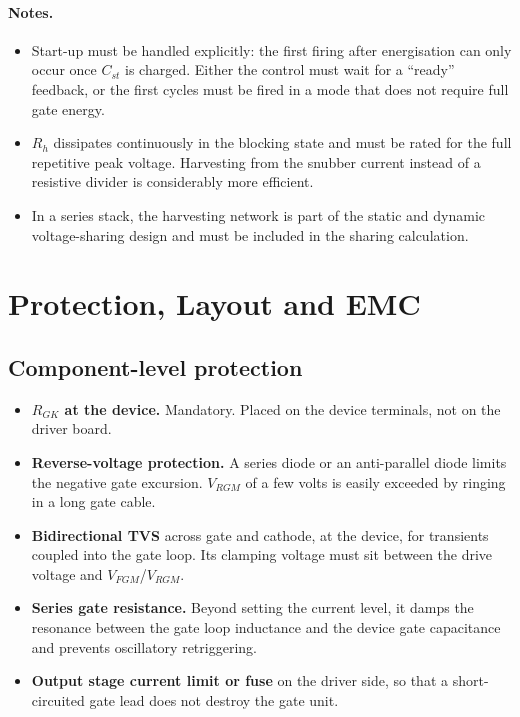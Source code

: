 \paragraph{Notes.}
\begin{itemize}
  \item Start-up must be handled explicitly: the first firing after energisation
        can only occur once $C_{st}$ is charged. Either the control must wait for a
        ``ready'' feedback, or the first cycles must be fired in a mode that does
        not require full gate energy.
  \item $R_h$ dissipates continuously in the blocking state and must be rated for
        the full repetitive peak voltage. Harvesting from the snubber current
        instead of a resistive divider is considerably more efficient.
  \item In a series stack, the harvesting network is part of the static and dynamic
        voltage-sharing design and must be included in the sharing calculation.
\end{itemize}

\section{Protection, Layout and EMC}

\subsection{Component-level protection}

\begin{itemize}
  \item \textbf{$R_{GK}$ at the device.} Mandatory. Placed on the device terminals,
        not on the driver board.
  \item \textbf{Reverse-voltage protection.} A series diode or an anti-parallel
        diode limits the negative gate excursion. $V_{RGM}$ of a few volts is
        easily exceeded by ringing in a long gate cable.
  \item \textbf{Bidirectional TVS} across gate and cathode, at the device, for
        transients coupled into the gate loop. Its clamping voltage must sit
        between the drive voltage and $V_{FGM}$/$V_{RGM}$.
  \item \textbf{Series gate resistance.} Beyond setting the current level, it damps
        the resonance between the gate loop inductance and the device gate
        capacitance and prevents oscillatory retriggering.
  \item \textbf{Output stage current limit or fuse} on the driver side, so that a
        short-circuited gate lead does not destroy the gate unit.
\end{itemize}

